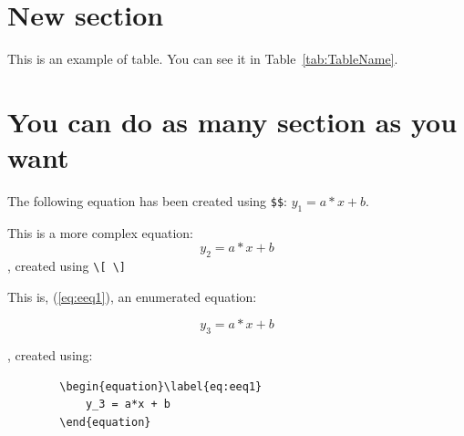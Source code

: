 \section{New section}
This is an example of table. You can see it in Table~\ref{tab:TableName}. 

 \begin{table}[h!tb]
   \centering \caption{Table caption}
   \label{tab:TableName}
   \vskip 0.2cm
 \end{table}

\section{You can do as many section as you want}
The following equation has been created using \verb.$$.: $ y_1 = a*x + b$.

\smallskip

\noindent
This is a more complex equation: \[ y_2 = a*x + b \], created using \verb.\[ \].

\bigskip

\noindent
This is, (\ref{eq:eeq1}), an enumerated equation: 

	\begin{equation}\label{eq:eeq1}
		y_3 = a*x + b
	\end{equation}

, created using:

	\begin{verbatim}
		\begin{equation}\label{eq:eeq1}
		    y_3 = a*x + b
		\end{equation}
	\end{verbatim}

